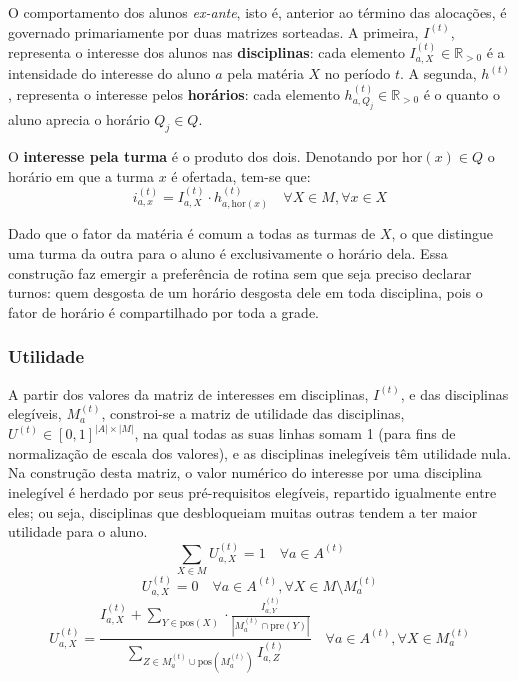 \documentclass[
    12pt,
    openany,
    oneside,
    a4paper,
    english,
    brazil
]{abntex2}
\begin{document}
O comportamento dos alunos \textit{ex-ante}, isto é, anterior ao término das alocações, é governado primariamente por duas matrizes sorteadas. A primeira, $I^{(t)}$, representa o interesse dos alunos nas \textbf{disciplinas}: cada elemento $I^{(t)}_{a, X} \in \mathbb{R}_{>0}$ é a intensidade do interesse do aluno $a$ pela matéria $X$ no período $t$. A segunda, $h^{(t)}$, representa o interesse pelos \textbf{horários}: cada elemento $h^{(t)}_{a, Q_j} \in \mathbb{R}_{>0}$ é o quanto o aluno aprecia o horário $Q_j \in Q$.

O \textbf{interesse pela turma} é o produto dos dois. Denotando por $\mathrm{hor}(x) \in Q$ o horário em que a turma $x$ é ofertada, tem-se que:
\begin{equation} \label{eq:interesse-turma}
    i^{(t)}_{a, x} = I^{(t)}_{a, X} \cdot h^{(t)}_{a, \mathrm{hor}(x)}
    \quad \forall X \in M, \forall x \in X
\end{equation}

Dado que o fator da matéria é comum a todas as turmas de $X$, o que distingue uma turma da outra para o aluno é exclusivamente o horário dela. Essa construção faz emergir a preferência de rotina sem que seja preciso declarar turnos: quem desgosta de um horário desgosta dele em toda disciplina, pois o fator de horário é compartilhado por toda a grade.

\subsubsection{Utilidade}

A partir dos valores da matriz de interesses em disciplinas, $I^{(t)}$, e das disciplinas elegíveis, $M_a^{(t)}$, constroi-se a matriz de utilidade das disciplinas, $U^{(t)} \in [0, 1]^{|A| \times |M|}$, na qual todas as suas linhas somam 1 (para fins de normalização de escala dos valores), e as disciplinas inelegíveis têm utilidade nula. Na construção desta matriz, o valor numérico do interesse por uma disciplina inelegível é herdado por seus pré-requisitos elegíveis, repartido igualmente entre eles; ou seja, disciplinas que desbloqueiam muitas outras tendem a ter maior utilidade para o aluno.
\begin{equation}
    \sum_{X \in M} U_{a, X}^{(t)} = 1
    \quad \forall{a \in A^{(t)}}
\end{equation}
\begin{equation}
    U_{a, X}^{(t)} = 0 
    \quad
    \forall a \in A^{(t)}, \forall X \in M \setminus M_a^{(t)}
\end{equation}
\begin{equation}
    U_{a, X}^{(t)} =
    \frac{
        I_{a, X}^{(t)}
        + \sum_{Y \in \mathrm{pos}(X)} \cdot
        \frac{I_{a, Y}^{(t)}}{\left| M_a^{(t)} \cap \mathrm{pre}(Y) \right|}
    }{
        \sum_{Z \in M_a^{(t)} \cup \mathrm{pos}(M_a^{(t)})} I_{a, Z}^{(t)}
    }
    \quad
    \forall a \in A^{(t)}, \forall X \in M_a^{(t)}
\end{equation}
\end{document}
